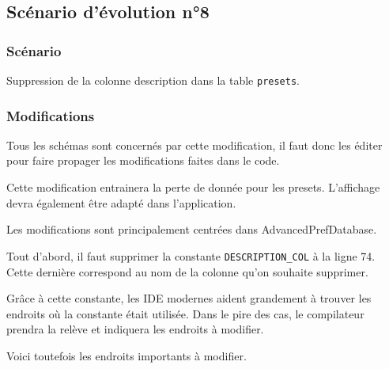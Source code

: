 \subsection{Scénario d'évolution n°8}
\subsubsection{Scénario}
Suppression de la colonne description dans la table \texttt{presets}.

\subsubsection{Modifications}
Tous les schémas sont concernés par cette modification, il faut donc les éditer pour faire propager les modifications faites dans le code.

Cette modification entrainera la perte de donnée pour les presets. L'affichage devra également être adapté dans l’application.

Les modifications sont principalement centrées dans AdvancedPrefDatabase.

Tout d'abord, il faut supprimer la constante \texttt{DESCRIPTION_COL} à la ligne 74. Cette dernière correspond au nom de la colonne qu'on souhaite supprimer.

Grâce à cette constante, les IDE modernes aident grandement à trouver les endroits où la constante était utilisée. Dans le pire des cas, le compilateur prendra la relève et indiquera les endroits à modifier.

Voici toutefois les endroits importants à modifier.

